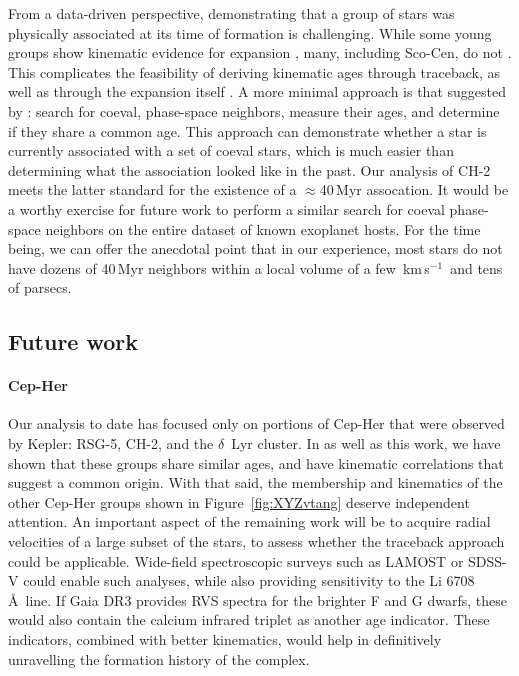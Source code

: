 \documentclass[12pt,twocolumn]{aastex63}
\newcommand{\kms}{\,km\,s$^{-1}$}
\begin{document}
From a data-driven perspective, demonstrating that a group of stars
was physically associated at its time of formation is challenging.
While some young groups show kinematic evidence for expansion
\citep{kuhn_kinematics_2019}, many, including Sco-Cen, do not
\citep{wright_kinematics_2018}.  This complicates the feasibility of
deriving kinematic ages through traceback, as well as through the
expansion itself \citep[see][]{crundall_chronostar_2019}.  A more
minimal approach is that suggested by \citet{tofflemire_2021}: search
for coeval, phase-space neighbors, measure their ages, and determine
if they share a common age.  This approach can demonstrate whether a
star is currently associated with a set of coeval stars, which
is much easier than determining what the association looked like in
the past.  Our analysis of CH-2 meets the latter standard for the
existence of a $\approx$40\,Myr assocation.  It would be a worthy
exercise for future work to perform a similar search for coeval
phase-space neighbors on the entire dataset of known exoplanet hosts.
For the time being, we can offer the anecdotal point that in our
experience, most stars do not have dozens of 40\,Myr neighbors within
a local volume of a few \kms\ and tens of parsecs.


\subsection{Future work}

\paragraph{Cep-Her}
Our analysis to date has focused only on portions of Cep-Her that were
observed by Kepler: RSG-5, CH-2, and the $\delta$~Lyr cluster.  In
\citet{bouma_kep1627_2022} as well as this work, we have shown that
these groups share similar ages, and have kinematic correlations that
suggest a common origin.  With that said, the membership and
kinematics of the other Cep-Her groups shown in Figure~\ref{fig:XYZvtang}
deserve independent attention.  An important aspect of the remaining work 
will be to acquire radial velocities of a large subset of the
stars, to assess whether the traceback approach could be applicable.
Wide-field spectroscopic surveys such as LAMOST
\citep{zhao_2012_LAMOST} or SDSS-V \citep{kollmeier_2017} could enable
such analyses, while also providing sensitivity to the Li 6708\,\AA\
line.  If Gaia DR3 provides RVS spectra for the brighter F and G
dwarfs, these would also contain the calcium infrared triplet as another
age indicator.  These indicators, combined with better kinematics,
would help in definitively unravelling the formation history of the
complex.
\end{document}
